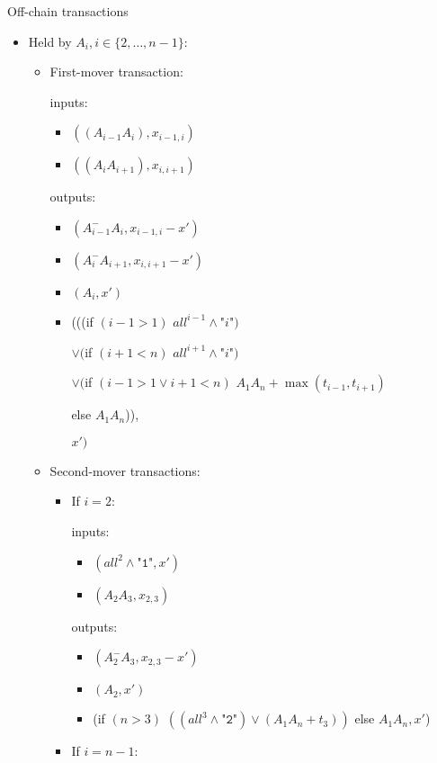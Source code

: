\begin{notitlebox}{Off-chain transactions}
\begin{itemize}
    \item Held by $A_i, i \in \{2, \dots, n-1\}$:

    \begin{itemize}
      \item First-mover transaction:

      inputs:
      \begin{itemize}
        \item $((A_{i-1} A_i), x_{i-1,i})$
        \item $((A_i A_{i+1}), x_{i,i+1})$
      \end{itemize}
      outputs:
      \begin{itemize}
        \item $(A_{i-1}^- A_i, x_{i-1,i} - x')$
        \item $(A_i^- A_{i+1}, x_{i,i+1} - x')$
        \item $(A_i, x')$
        \item (((if $(i-1 > 1)$ $\mathit{all}^{i-1} \wedge
        \texttt{"}i\texttt{"})$

        $\vee ($if $(i+1 < n)$ $\mathit{all}^{i+1} \wedge
        \texttt{"}i\texttt{"})$

        $\vee ($if $(i-1 > 1 \vee i+1 < n)$ $A_1 A_n+\max{(t_{i-1}, t_{i+1})}$

        \:\:\: else $A_1 A_n$)),

        $x')$
      \end{itemize}
      \item Second-mover transactions:
      \begin{itemize}
        \item If $i = 2$:

        inputs:
        \begin{itemize}
          \item $(\mathit{all}^2 \wedge \texttt{"1"}, x')$
          \item $(A_2 A_3, x_{2,3})$
        \end{itemize}
        outputs:
        \begin{itemize}
          \item $(A_2^- A_3, x_{2,3} - x')$
          \item $(A_2, x')$
          \item (if $(n > 3)$ $((\mathit{all}^{3} \wedge \texttt{"2"}) \vee
          (A_1 A_n + t_3))$ else $A_1 A_n, x'$)
        \end{itemize}
        \item If $i = n-1$:


\end{itemize}
\end{itemize}
\end{itemize}
\end{notitlebox}
